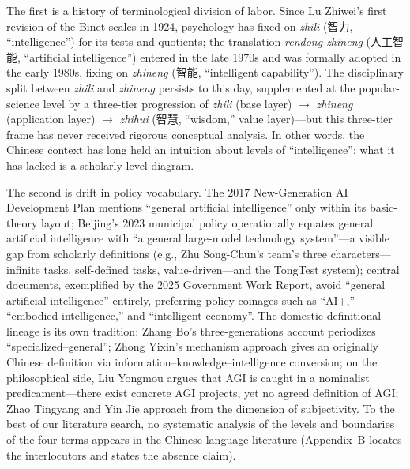 \documentclass[10pt]{article}
\begin{document}
The first is a history of terminological division of labor. Since Lu Zhiwei's first revision of the Binet scales in 1924\cite{zhang2020psychometrics}, psychology has fixed on \emph{zhili} (智力, ``intelligence'') for its tests and quotients; the translation \emph{rendong zhineng} (人工智能, ``artificial intelligence'') entered in the late 1970s and was formally adopted in the early 1980s, fixing on \emph{zhineng} (智能, ``intelligent capability''). The disciplinary split between \emph{zhili} and \emph{zhineng} persists to this day, supplemented at the popular-science level by a three-tier progression of \emph{zhili} (base layer) $\to$ \emph{zhineng} (application layer) $\to$ \emph{zhihui} (智慧, ``wisdom,'' value layer)---but this three-tier frame has never received rigorous conceptual analysis. In other words, the Chinese context has long held an intuition about levels of ``intelligence''; what it has lacked is a scholarly level diagram.

The second is drift in policy vocabulary. The 2017 New-Generation AI Development Plan mentions ``general artificial intelligence'' only within its basic-theory layout\cite{state2017plan}; Beijing's 2023 municipal policy operationally equates general artificial intelligence with ``a general large-model technology system''\cite{beijing2023measures}---a visible gap from scholarly definitions (e.g., Zhu Song-Chun's team's three characters---infinite tasks, self-defined tasks, value-driven---and the TongTest system\cite{zhu2025tongtest}); central documents, exemplified by the 2025 Government Work Report, avoid ``general artificial intelligence'' entirely, preferring policy coinages such as ``AI+,'' ``embodied intelligence,'' and ``intelligent economy''\cite{gov2025report}. The domestic definitional lineage is its own tradition: Zhang Bo's three-generations account periodizes ``specialized--general''\cite{zhang2020third}; Zhong Yixin's mechanism approach gives an originally Chinese definition via information--knowledge--intelligence conversion\cite{zhong2018mechanism}; on the philosophical side, Liu Yongmou argues that AGI is caught in a nominalist predicament---there exist concrete AGI projects, yet no agreed definition of AGI\cite{liu2024complex}; Zhao Tingyang and Yin Jie approach from the dimension of subjectivity\cite{zhao2019selfconscious}. To the best of our literature search, no systematic analysis of the levels and boundaries of the four terms appears in the Chinese-language literature (Appendix~B locates the interlocutors and states the absence claim).
\end{document}
